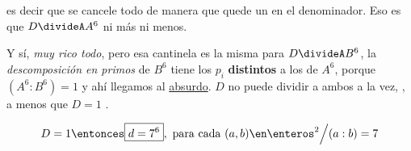 es decir que se cancele todo de manera que quede un  en el denominador.
Eso es que $D \divideA A^6$ ni más ni menos.\par

Y sí, \textit{muy rico todo}, pero esa cantinela es la misma para $D \divideA B^6$,  la
\textit{descomposición en primos} de $B^6$ tiene los $p_i$ \textbf{distintos} a los de $A^6$, porque
$(A^6:B^6) = 1$\red{!} y ahí llegamos al \underline{absurdo}. $D$ no puede dividir a ambos
a la vez, , a menos que $D = 1$ \Tilde.

$$
  D = 1 \entonces \boxed{d = 7^6}, \text{ para cada } (a,b) \en \enteros^2 \Big / (a:b) = 7
$$

\begin{aportes}
  \item {}
\end{aportes}
